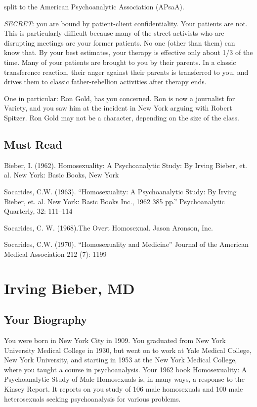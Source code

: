 \begin{refsection}
split to the American Psychoanalytic Association (APsaA).

\emph{SECRET}: you are bound by patient-client confidentiality. Your patients are not. This is particularly difficult because many of the street activists who are disrupting meetings are your former patients. No one (other than them) can know that. By your best estimates, your therapy is effective only about 1\slash 3 of the time. Many of your patients are brought to you by their parents. In a classic transference reaction, their anger against their parents is transferred to you, and drives them to classic father-rebellion activities after therapy ends. 

One in particular: Ron Gold, has you concerned. Ron is now a journalist for Variety, and you saw him at the incident in New York arguing with Robert Spitzer. Ron Gold may not be a character, depending on the size of the class.

\section{Must Read}
\label{mustread}

Bieber, I. (1962). Homosexuality: A Psychoanalytic Study: By Irving Bieber, et. al. New York: Basic Books, New York

Socarides, C.W. (1963). “Homosexuality: A Psychoanalytic Study: By Irving Bieber, et. al. New York: Basic Books Inc., 1962 385 pp.” Psychoanalytic Quarterly, 32: 111--114

Socarides, C. W. (1968).The Overt Homosexual. Jason Aronson, Inc.

Socarides, C.W. (1970). “Homosexuality and Medicine” Journal of the American Medical Association 212 (7): 1199

\chapter{Irving Bieber, MD}
\label{irvingbiebermd}

\section{Your Biography}
\label{yourbiography}

You were born in New York City in 1909. You graduated from New York University Medical College in 1930, but went on to work at Yale Medical College, New York University, and starting in 1953 at the New York Medical College, where you taught a course in psychoanalysis. Your 1962 book Homosexuality: A Psychoanalytic Study of Male Homosexuals is, in many ways, a response to the Kinsey Report. It reports on you study of 106 male homosexuals and 100 male heterosexuals seeking psychoanalysis for various problems.


\end{refsection}
